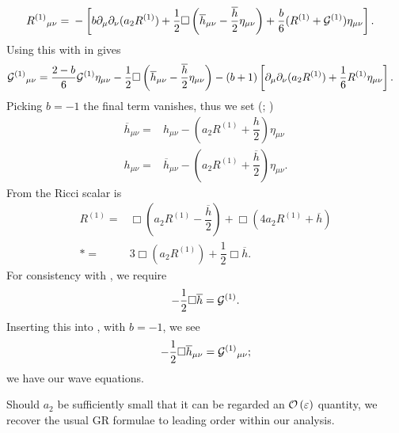 \begin{align}
{R^{(1)}}_{\mu\nu} = {} & -\left[b \partial_\mu\partial_\nu(a_2  R^{(1)}) + \dfrac{1}{2}\Box\left(\overline{h}_{\mu\nu} -\dfrac{\overline{h}}{2}\eta_{\mu\nu}\right) + \dfrac{b}{6}(R^{(1)} + \mathcal{G}^{(1)})\eta_{\mu\nu}\right].
\label{eq:new_Ricci}
\end{align}
Using this with  in  gives
\begin{align}
{\mathcal{G}^{(1)}}_{\mu\nu} = {} & \dfrac{2 - b}{6}\mathcal{G}^{(1)}\eta_{\mu\nu} -\dfrac{1}{2}\Box\left(\overline{h}_{\mu\nu} - \dfrac{\overline{h}}{2}\eta_{\mu\nu}\right) - (b + 1)\left[\partial_\mu\partial_\nu(a_2 R^{(1)}) + \dfrac{1}{6}R^{(1)}\eta_{\mu\nu}\right].
\label{eq:b_Field}
\end{align}
Picking $b = -1$ the final term vanishes, thus we set (\citealt[section 10.3]{Will1993}; \citealt{Corda2008, Capozziello2008}) %
\begin{subequations}
\begin{align}
\label{eq:hbar_metric}
\overline{h}_{\mu\nu} = {} & h_{\mu\nu} - \left(a_2 R^{(1)} + \dfrac{h}{2}\right)\eta_{\mu\nu}\\
h_{\mu\nu} = {} & \overline{h}_{\mu\nu} - \left(a_2 R^{(1)} + \dfrac{\overline{h}}{2}\right)\eta_{\mu\nu}.
\label{eq:h_metric}
\end{align}
\end{subequations}
From  the Ricci scalar is 
\begin{align}
R^{(1)} = {} & \Box \left(a_2 R^{(1)} -\dfrac{\overline{h}}{2}\right) + \Box (4 a_2 R^{(1)} + \overline{h}) \nonumber \\*
 = {} & 3 \Box(a_2 R^{(1)}) + \dfrac{1}{2}\Box \overline{h}.
\label{eq:Ricci_Box_h}
\end{align}
For consistency with , we require
\begin{equation}
-\dfrac{1}{2}\Box \overline{h} = \mathcal{G}^{(1)}.
\label{eq:Box_h}
\end{equation}
Inserting this into , with $b = -1$, we see
\begin{equation}
-\dfrac{1}{2}\Box \overline{h}_{\mu\nu} = {\mathcal{G}^{(1)}}_{\mu\nu};
\label{eq:Box_hmunu}
\end{equation}
we have our wave equations.

Should $a_2$ be sufficiently small that it can be regarded an $\mathcal{O}\left({\varepsilon}\right)$ quantity, we recover the usual GR formulae to leading order within our analysis.

